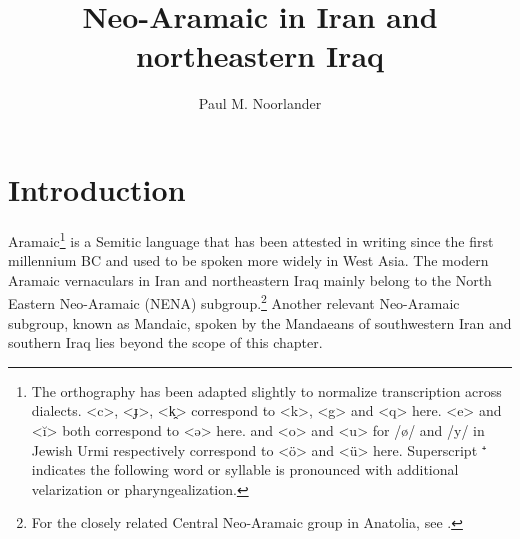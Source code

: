 \documentclass[output=paper,colorlinks,citecolor=brown,draftmode]{langscibook}
\author{Paul M. Noorlander\orcid{0000-0002-9407-1453}\affiliation{University of Cambridge}}
\title{Neo-Aramaic in Iran and northeastern Iraq}
\begin{document}
\maketitle\label{WOWA:ch:15}

\section{Introduction}
Aramaic\footnote{The orthography has been adapted slightly to normalize transcription across dialects.  <c>, <ɟ>, <k̭> correspond to <k>, <g> and <q> here.  <e> and  <ĭ> both correspond to <ə> here. \citet{Garbell1065a} and  <o> and <u> for /ø/ and /y/ in Jewish Urmi respectively correspond to <ö> and <ü> here. Superscript ⁺ indicates the following word or syllable is pronounced with additional velarization or pharyngealization.} is a Semitic language that has been attested in writing since the first millennium BC and used to be spoken more widely in West Asia. The modern Aramaic vernaculars in Iran and northeastern Iraq mainly belong to the North Eastern Neo-Aramaic (NENA) subgroup.\footnote{For the closely related Central Neo-Aramaic group in Anatolia, see .}  Another relevant Neo-Aramaic subgroup, known as Mandaic, spoken by the Mandaeans of southwestern Iran and southern Iraq \parencite[e.g.][]{Haberl2011NeoMandaic} lies beyond the scope of this chapter.
\end{document}
